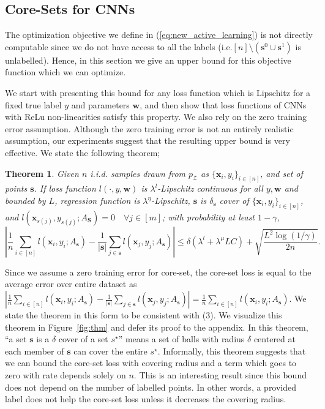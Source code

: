 \documentclass{article} %
\makeatletter
\newtheorem{theorem}{Theorem}
\newcommand*{\ie}{i.e.\@\xspace}
\makeatother
\begin{document}
\subsection{Core-Sets for CNNs} 
The optimization objective we define in (\ref{eq:new_active_learning}) is not directly computable since we do not have
access to all the labels (\ie $[n] \setminus (\mathbf{s}^0 \cup \mathbf{s}^1)$ is unlabelled). Hence, in this section we
give an upper bound for this objective function which we can optimize. 

We start with presenting this bound for any loss function which is Lipschitz for a fixed true label $y$ and parameters $\mathbf{w}$, and then show that loss functions of CNNs with ReLu non-linearities satisfy this property. We also rely on the zero training error assumption. Although the zero training error is not an entirely realistic assumption,  our experiments suggest that the resulting upper bound is very effective. We state the following theorem;
\begin{theorem} Given $n$ i.i.d. samples drawn from $p_\mathcal{Z}$ as $\{\mathbf{x}_i,y_i\}_{i\in[n]}$, and set of
    points $\mathbf{s}$. If loss function $l(\cdot,y,\mathbf{w})$ is $\lambda^l$-Lipschitz continuous
    for all $y, \mathbf{w}$ and bounded by $L$, regression function is $\lambda^\eta$-Lipschitz, $\mathbf{s}$
    is $\delta_\mathbf{s}$ cover of $\{\mathbf{x}_i,y_i\}_{i\in[n]}$, and
    $l(\mathbf{x}_{s(j)},y_{s(j)}; A_\mathbf{S})=0\quad \forall j \in [m]$; with probability at least $1-\gamma$,
    \[
    \left| \frac{1}{n}\sum_{i \in [n]} l(\mathbf{x}_i,y_i; A_{\mathbf{s}}) -
    \frac{1}{|\mathbf{s}|}\sum_{j \in \mathbf{s}} l(\mathbf{x}_j,y_j;A_{\mathbf{s}}) \right|  \leq \delta (\lambda^l + \lambda^\mu LC)+ \sqrt{\frac{L^2
    \log(1/\gamma)}{2n}}. \]
\label{mainthm2} \end{theorem}

Since we assume a zero training error for core-set, the core-set loss is equal to the average error over entire dataset as \mbox{$\left| \frac{1}{n}\sum_{i \in [n]} l(\mathbf{x}_i,y_i; A_{\mathbf{s}}) -
    \frac{1}{|\mathbf{s}|}\sum_{j \in \mathbf{s}} l(\mathbf{x}_j,y_j;A_{\mathbf{s}}) \right| = \frac{1}{n}\sum_{i \in [n]} l(\mathbf{x}_i,y_i; A_{\mathbf{s}})$}. We state the theorem in this form to be consistent with (3). We visualize this theorem in Figure~\ref{fig:thm} and defer its proof to the appendix. In this theorem, ``a set $\mathbf{s}$ is a $\delta$ cover of a set $s^\star$''  means a set of balls with radius
$\delta$ centered at each member of $\mathbf{s}$ can cover the entire $s^\star$. Informally, this theorem suggests that we can bound the core-set loss with covering radius and a term which goes to
zero with rate depends solely on $n$. This is an interesting result since this bound does not depend on the number of labelled points. In
other words, a provided label does not help the core-set loss unless it decreases the covering radius.
\end{document}
